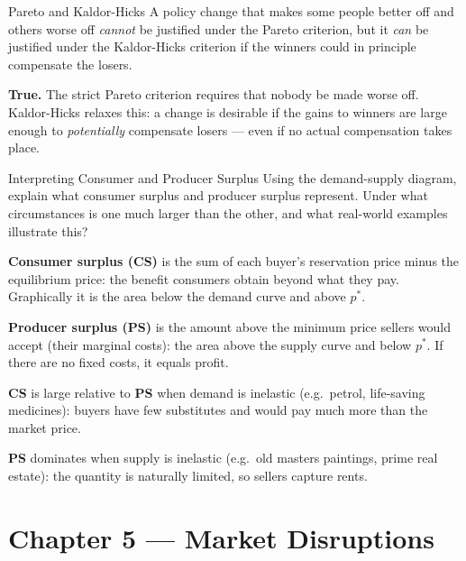 \documentclass[paper=a5]{scrartcl}
\begin{document}
\begin{question}[type=tf]{Pareto and Kaldor-Hicks}
A policy change that makes some people better off and others worse off
\emph{cannot} be justified under the Pareto criterion, but it \emph{can}
be justified under the Kaldor-Hicks criterion if the winners could in
principle compensate the losers.
\truefalse[true]
\begin{solution}
  \textbf{True.} The strict Pareto criterion requires that nobody be made worse
  off. Kaldor-Hicks relaxes this: a change is desirable if the gains to winners
  are large enough to \emph{potentially} compensate losers — even if no actual
  compensation takes place.
\end{solution}
\end{question}

\begin{question}[type=open]{Interpreting Consumer and Producer Surplus}
Using the demand-supply diagram, explain what consumer surplus and producer
surplus represent. Under what circumstances is one much larger than the other,
and what real-world examples illustrate this?

\answerlines[6]

\begin{solution}
  \textbf{Consumer surplus (CS)} is the sum of each buyer's reservation price
  minus the equilibrium price: the benefit consumers obtain beyond what they
  pay. Graphically it is the area below the demand curve and above $p^*$.

  \textbf{Producer surplus (PS)} is the amount above the minimum price sellers
  would accept (their marginal costs): the area above the supply curve and below
  $p^*$. If there are no fixed costs, it equals profit.

  \textbf{CS} is large relative to \textbf{PS} when demand is inelastic (e.g.\
  petrol, life-saving medicines): buyers have few substitutes and would pay
  much more than the market price.

  \textbf{PS} dominates when supply is inelastic (e.g.\ old masters paintings,
  prime real estate): the quantity is naturally limited, so sellers capture
  rents.
\end{solution}
\end{question}


\section{Chapter 5 — Market Disruptions}
\end{document}
